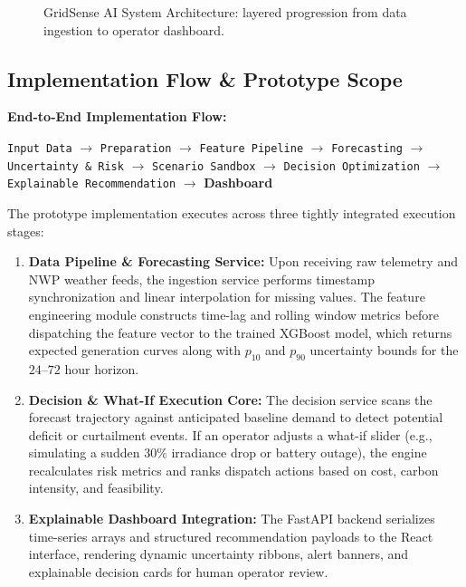 \begin{figure}[htbp]
    \caption{GridSense AI System Architecture: layered progression from data ingestion to operator dashboard.}
    \label{fig:system_architecture}
\end{figure}

\subsection{Implementation Flow \& Prototype Scope}
\label{subsec:implementation_flow}

\textbf{End-to-End Implementation Flow:}
\begin{center}
    \small
    \texttt{Input Data} $\longrightarrow$ \texttt{Preparation} $\longrightarrow$ \texttt{Feature Pipeline} $\longrightarrow$ \texttt{Forecasting} $\longrightarrow$ \texttt{Uncertainty \& Risk} $\longrightarrow$ \texttt{Scenario Sandbox} $\longrightarrow$ \texttt{Decision Optimization} $\longrightarrow$ \texttt{Explainable Recommendation} $\longrightarrow$ \textbf{\color{accentAmber}Dashboard}
\end{center}

The prototype implementation executes across three tightly integrated execution stages:
\begin{enumerate}[leftmargin=1.5em, itemsep=0.3em]
    \item \textbf{Data Pipeline \& Forecasting Service:} Upon receiving raw telemetry and NWP weather feeds, the ingestion service performs timestamp synchronization and linear interpolation for missing values. The feature engineering module constructs time-lag and rolling window metrics before dispatching the feature vector to the trained XGBoost model, which returns expected generation curves along with $p_{10}$ and $p_{90}$ uncertainty bounds for the $24$--$72$ hour horizon.
    \item \textbf{Decision \& What-If Execution Core:} The decision service scans the forecast trajectory against anticipated baseline demand to detect potential deficit or curtailment events. If an operator adjusts a what-if slider (e.g., simulating a sudden $30\%$ irradiance drop or battery outage), the engine recalculates risk metrics and ranks dispatch actions based on cost, carbon intensity, and feasibility.
    \item \textbf{Explainable Dashboard Integration:} The FastAPI backend serializes time-series arrays and structured recommendation payloads to the React interface, rendering dynamic uncertainty ribbons, alert banners, and explainable decision cards for human operator review.
\end{enumerate}

